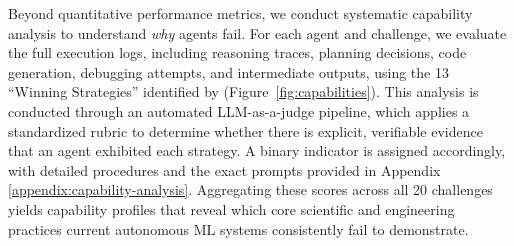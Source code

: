 \documentclass{midl} %
\begin{document}
Beyond quantitative performance metrics, we conduct systematic capability analysis to understand \textit{why} agents fail.
For each agent and challenge, we evaluate the full execution logs, including reasoning traces, planning decisions, code generation, debugging attempts, and intermediate outputs, using the 13 “Winning Strategies” identified by \citet{eisenmann2023winner} (Figure~\ref{fig:capabilities}). This analysis is conducted through an automated LLM-as-a-judge pipeline, which applies a standardized rubric to determine whether there is explicit, verifiable evidence that an agent exhibited each strategy. A binary indicator is assigned accordingly, with detailed procedures and the exact prompts provided in Appendix \ref{appendix:capability-analysis}. Aggregating these scores across all 20 challenges yields capability profiles that reveal which core scientific and engineering practices current autonomous ML systems consistently fail to demonstrate.


\end{document}
